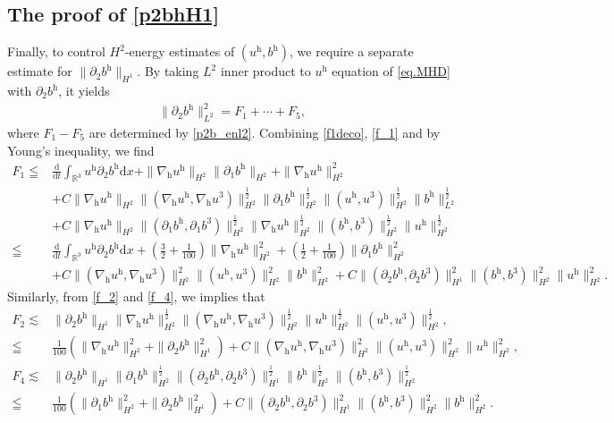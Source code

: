 \documentclass[11pt]{amsart}
\theoremstyle{definition}
\newcommand{\R}{\mathbb{R}}
\newcommand{\h}{\mathrm{h}}
\newcommand{\nablah}{\nabla_{\mathrm{h}}}
\numberwithin{equation}{section}
\begin{document}
\subsection{The proof of \eqref{p2bhH1}}
Finally, to control $H^{2}$-energy estimates of  $(u^\h,b^\h)$, we require a separate estimate for $\|\partial_2b^\h\|_{H^1}$.
By taking $L^2$ inner product to $u^\h$ equation of \eqref{eq.MHD} with $\partial_2b^\h$, it yields
\begin{align}\label{p2bh_enl2}
	\|\partial_2b^\h\|_{L^2}^2= F_1+\cdots+F_{5},
\end{align}
where $F_1-F_{5}$ are determined by \eqref{p2b_enl2}. Combining \eqref{f1deco}, \eqref{f_1} and by Young's inequality, we find
\begin{align}\label{F1h}
	F_1\leqq& \frac{\mathrm{d}}{\mathrm{d} t}\int_{\R^3} u^\h\partial_2 b^\h\mathrm{d} x+\|\nablah u^\h\|_{H^2}\|\partial_1 b^\h\|_{H^2}+\|\nablah u^\h\|_{H^2}^2\nonumber\\
	&+C\|\nablah u^\h\|_{H^2}\|(\nablah u^\h,\nablah u^3)\|_{H^2}^\frac12\|\partial_1 b^\h\|_{H^2}^\frac12\|( u^\h, u^3)\|_{H^2}^\frac12\|b^\h\|_{L^2}^\frac12\nonumber\\
	&+C\|\nablah u^\h\|_{H^2}\|(\partial_1b^\h,\partial_1b^3)\|_{H^2}^\frac12\|\nablah u^\h\|_{H^2}^\frac12\|(b^\h,b^3)\|_{H^2}^\frac12\| u^\h\|_{H^2}^\frac12\nonumber\\
	\leqq&\frac{\mathrm{d}}{\mathrm{d} t}\int_{\R^3} u^\h\partial_2 b^\h\mathrm{d} x+(\frac32+\frac{1}{100})\|\nablah u^\h\|_{H^2}^2+(\frac12+\frac{1}{100})\|\partial_1 b^\h\|_{H^2}^2\nonumber\\
	&+C\|(\nablah u^\h,\nablah u^3)\|_{H^2}^2\|( u^\h, u^3)\|_{H^2}^2\| b^\h\|_{H^2}^2+C\|(\partial_2 b^\h,\partial_2 b^3)\|_{H^1}^2\|( b^\h, b^3)\|_{H^2}^2\| u^\h\|_{H^2}^2.
\end{align}
Similarly, from \eqref{f_2} and \eqref{f_4}, we implies that
\begin{align}\label{F2h}
	F_2	\lesssim &\|\partial_2 b^\h\|_{H^1}\|\nablah u^\h\|_{H^2}^\frac12\|(\nablah u^\h,\nablah u^3)\|_{H^2}^\frac12\| u^\h\|_{H^2}^\frac12\|( u^\h, u^3)\|_{H^2}^\frac12,\nonumber\\
	\leqq &\frac{1}{100}\left(\|\nablah u^\h\|_{H^2}^2+\|\partial_2 b^\h\|_{H^1}^2\right)+C\|(\nablah u^\h,\nablah u^3)\|_{H^2}^2\|( u^\h, u^3)\|_{H^2}^2\| u^\h\|_{H^2}^2,\\
	\label{F4h}
	F_4\lesssim& \|\partial_2 b^\h\|_{H^1}\|\partial_1 b^\h\|_{H^2}^\frac12\|(\partial_2 b^\h,\partial_2 b^3)\|_{H^1}^\frac12\| b^\h\|_{H^2}^\frac12\|( b^\h, b^3)\|_{H^2}^\frac12\nonumber\\
	\leqq &\frac{1}{100}\left(\|\partial_1 b^\h\|_{H^2}^2+\|\partial_2 b^\h\|_{H^1}^2\right)+C\|(\partial_2 b^\h,\partial_2 b^3)\|_{H^1}^2\|( b^\h, b^3)\|_{H^2}^2\| b^\h\|_{H^2}^2.
\end{align}
\end{document}

